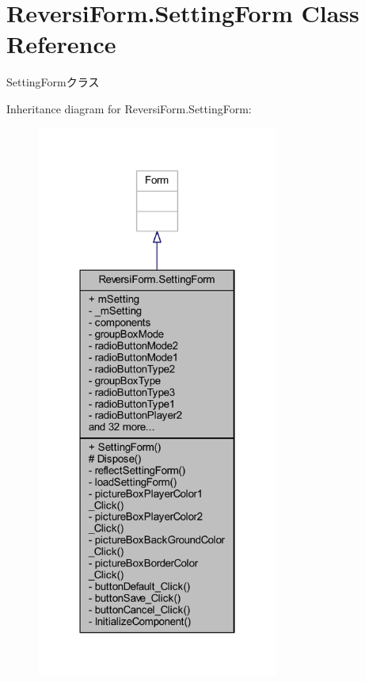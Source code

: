 \hypertarget{class_reversi_form_1_1_setting_form}{}\section{Reversi\+Form.\+Setting\+Form Class Reference}
\label{class_reversi_form_1_1_setting_form}


Setting\+Formクラス  




Inheritance diagram for Reversi\+Form.\+Setting\+Form\+:
\nopagebreak
\begin{figure}[H]
\begin{center}
\leavevmode
\includegraphics[width=226pt]{class_reversi_form_1_1_setting_form__inherit__graph}
\end{center}
\end{figure}


